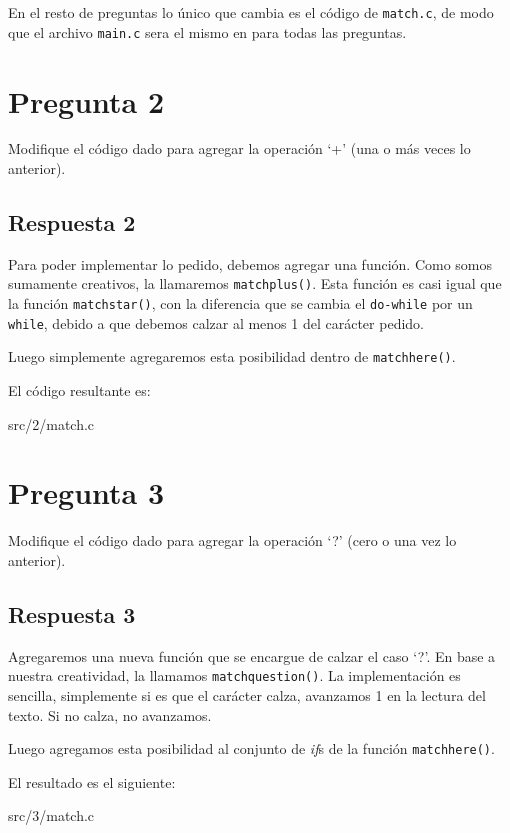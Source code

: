 \documentclass[spanish, fleqn]{article}
\begin{document}
En el resto de preguntas lo único que cambia es el código de \texttt{match.c}, de modo que el archivo \texttt{main.c} sera el mismo en para todas las preguntas.

\section{Pregunta 2}

Modifique el código dado para agregar la operación `+' (una o más veces lo anterior).

\subsection{Respuesta 2}

Para poder implementar lo pedido, debemos agregar una función. Como somos sumamente creativos, la llamaremos \texttt{matchplus()}. Esta función es casi igual que la función \texttt{matchstar()}, con la diferencia que se cambia el \texttt{do-while} por un \texttt{while}, debido a que debemos calzar al menos 1 del carácter pedido.

Luego simplemente agregaremos esta posibilidad dentro de \texttt{matchhere()}.

El código resultante es:

 {src/2/match.c}

\section{Pregunta 3}

Modifique el código dado para agregar la operación `?’ (cero o una vez lo anterior).

\subsection{Respuesta 3}

Agregaremos una nueva función que se encargue de calzar el caso `?'. En base a nuestra creatividad, la llamamos \texttt{matchquestion()}. La implementación es sencilla, simplemente si es que el carácter calza, avanzamos 1 en la lectura del texto. Si no calza, no avanzamos.

Luego agregamos esta posibilidad al conjunto de \textit{if}s de la función \texttt{matchhere()}.

El resultado es el siguiente:

 {src/3/match.c}
\end{document}
